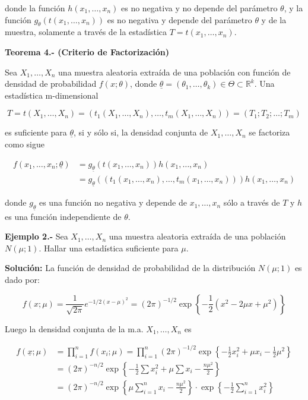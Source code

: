 \documentclass[
  11pt,
]{report}
\begin{document}
donde la función \(h(x_1, \dots, x_n)\) es no negativa y no depende del
parámetro \(\theta\), y la función \(g_\theta(t(x_1, \dots, x_n))\) es
no negativa y depende del parámetro \(\theta\) y de la muestra,
solamente a través de la estadística \(T = t(x_1, \dots, x_n)\).

\textbf{Teorema 4.- (Criterio de Factorización)}

Sea \(X_1, \dots, X_n\) una muestra aleatoria extraída de una población
con función de densidad de probabilidad \(f(x; \theta)\), donde
\(\underline{\theta} = (\theta_1, \dots, \theta_k) \in \Theta \subset \mathbb{R}^k\).
Una estadística m-dimensional

\[T = t(X_1, \dots, X_n) = (t_1(X_1, \dots, X_n), \dots, t_m(X_1, \dots, X_n)) = (T_1; T_2; \dots; T_m)\]

es suficiente para \(\underline{\theta}\), si y sólo si, la densidad
conjunta de \(X_1, \dots, X_n\) se factoriza como sigue

\[\begin{aligned}
f(x_1, \dots, x_n; \underline{\theta}) &= g_{\underline{\theta}}(t(x_1, \dots, x_n)) h(x_1, \dots, x_n) \\
&= g_{\underline{\theta}}((t_1(x_1, \dots, x_n), \dots, t_m(x_1, \dots, x_n))) h(x_1, \dots, x_n)
\end{aligned}\]

donde \(g_{\underline{\theta}}\) es una función no negativa y depende de
\(x_1, \dots, x_n\) sólo a través de \(T\) y \(h\) es una función
independiente de \(\theta\).

\textbf{Ejemplo 2.-} Sea \(X_1, \dots, X_n\) una muestra aleatoria
extraída de una población \(N(\mu; 1)\). Hallar una estadística
suficiente para \(\mu\).

\textbf{Solución:} La función de densidad de probabilidad de la
distribución \(N(\mu; 1)\) es dado por:

\[f(x; \mu) = \frac{1}{\sqrt{2\pi}} e^{-1/2(x-\mu)^2} = (2\pi)^{-1/2} \exp\left\{ -\frac{1}{2}(x^2 - 2\mu x + \mu^2) \right\}\]

Luego la densidad conjunta de la m.a. \(X_1, \dots, X_n\) es

\[\begin{aligned}
f(\underline{x}; \mu) &= \prod_{i=1}^n f(x_i; \mu) = \prod_{i=1}^n (2\pi)^{-1/2} \exp\left\{ -\frac{1}{2}x_i^2 + \mu x_i - \frac{1}{2}\mu^2 \right\} \\
&= (2\pi)^{-n/2} \exp\left\{ -\frac{1}{2}\sum x_i^2 + \mu \sum x_i - \frac{n\mu^2}{2} \right\} \\
&= (2\pi)^{-n/2} \exp\left\{ \mu \sum_{i=1}^n x_i - \frac{n\mu^2}{2} \right\} \cdot \exp\left\{ -\frac{1}{2}\sum_{i=1}^n x_i^2 \right\}
\end{aligned}\]
\end{document}
